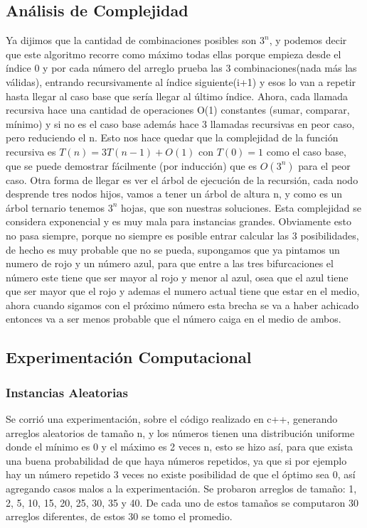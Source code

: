 \subsection*{Análisis de Complejidad}
Ya dijimos que la cantidad de combinaciones posibles son $3^n$, y podemos decir que este algoritmo recorre como máximo todas ellas porque empieza desde el índice 0 y por cada número del arreglo prueba las 3 combinaciones(nada más las válidas), entrando recursivamente al índice siguiente(i+1) y esos lo van a repetir hasta llegar al caso base que sería llegar al último índice. Ahora, cada llamada recursiva hace una cantidad de operaciones O(1) constantes (sumar, comparar, mínimo) y si no es el caso base además hace 3 llamadas recursivas en peor caso, pero reduciendo el n. Esto nos hace quedar que la complejidad de la función recursiva es $T(n) = 3T(n-1) + O(1)$ con $T(0) = 1$ como el caso base, que se puede demostrar fácilmente (por inducción) que es $O(3^n)$ para el peor caso. Otra forma de llegar es ver el árbol de ejecución de la recursión, cada nodo desprende tres nodos hijos, vamos a tener un árbol de altura n, y como es un árbol ternario tenemos $3^n$ hojas, que son nuestras soluciones. Esta complejidad se considera exponencial y es muy mala para instancias grandes.
Obviamente esto no pasa siempre, porque no siempre es posible entrar calcular las 3 posibilidades, de hecho es muy probable que no se pueda, supongamos que ya pintamos un numero de rojo y un número azul, para que entre a las tres bifurcaciones el número este tiene que ser mayor al rojo y menor al azul, osea que el azul tiene que ser mayor que el rojo y ademas el numero actual tiene que estar en el medio, ahora cuando sigamos con el próximo número esta brecha se va a haber achicado entonces va a ser menos probable que el número caiga en el medio de ambos.

\subsection*{Experimentación Computacional}
\subsubsection*{Instancias Aleatorias}
Se corrió una experimentación, sobre el código realizado en c++, generando arreglos aleatorios de tamaño n, y los números tienen una distribución uniforme donde el mínimo es 0 y el máximo es 2 veces n, esto se hizo así, para que exista una buena probabilidad de que haya números repetidos, ya que si por ejemplo hay un número repetido 3 veces no existe posibilidad de que el óptimo sea 0, así agregando casos malos a la experimentación. Se probaron arreglos de tamaño: 1, 2, 5, 10, 15, 20, 25, 30, 35 y 40. De cada uno de estos tamaños se computaron 30 arreglos diferentes, de estos 30 se tomo el promedio.

